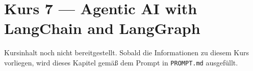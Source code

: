 \chapter{Kurs 7 --- Agentic AI with LangChain and LangGraph}

\begin{luecke}
Kursinhalt noch nicht bereitgestellt. Sobald die Informationen zu diesem Kurs vorliegen,
wird dieses Kapitel gem\"a\ss{} dem Prompt in \texttt{PROMPT.md} ausgef\"ullt.
\end{luecke}

